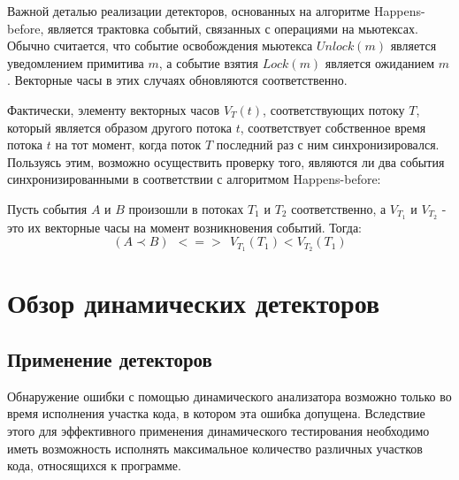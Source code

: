 Важной деталью реализации детекторов, основанных на алгоритме Happens-before, является трактовка событий, связанных с операциями на мьютексах.
Обычно считается, что событие освобождения мьютекса $Unlock(m)$ является уведомлением примитива $m$, а событие взятия $Lock(m)$ является ожиданием $m$.
Векторные часы в этих случаях обновляются соответственно.

Фактически, элементу векторных часов $V_T(t)$, соответствующих потоку $T$, который является образом другого потока $t$, соответствует собственное время потока $t$ на тот момент, когда поток $T$ последний раз с ним синхронизировался.
Пользуясь этим, возможно осуществить проверку того, являются ли два события синхронизированными в соответствии с алгоритмом Happens-before:
\begin{statement}
Пусть события $A$ и $B$ произошли в потоках $T_1$ и $T_2$ соответственно, а $V_{T_1}$ и $V_{T_2}$ - это их векторные часы на момент возникновения событий. Тогда:
$$
(A \prec B) ~~ <=> ~~ V_{T_1}(T_1) < V_{T_2}(T_1)
$$
\end{statement}


\section{Обзор динамических детекторов}

\subsection{Применение детекторов}

Обнаружение ошибки с помощью динамического анализатора возможно только во время исполнения участка кода, в котором эта ошибка допущена.
Вследствие этого для эффективного применения динамического тестирования необходимо иметь возможность исполнять максимальное количество различных участков кода, относящихся к программе.

